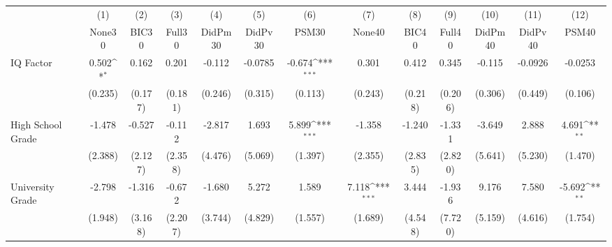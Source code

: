 {
\def\sym#1{\ifmmode^{#1}\else\(^{#1}\)\fi}
\begin{tabular}{l*{12}{c}}
\toprule
            &\multicolumn{1}{c}{(1)}&\multicolumn{1}{c}{(2)}&\multicolumn{1}{c}{(3)}&\multicolumn{1}{c}{(4)}&\multicolumn{1}{c}{(5)}&\multicolumn{1}{c}{(6)}&\multicolumn{1}{c}{(7)}&\multicolumn{1}{c}{(8)}&\multicolumn{1}{c}{(9)}&\multicolumn{1}{c}{(10)}&\multicolumn{1}{c}{(11)}&\multicolumn{1}{c}{(12)}\\
            &\multicolumn{1}{c}{None30}&\multicolumn{1}{c}{BIC30}&\multicolumn{1}{c}{Full30}&\multicolumn{1}{c}{DidPm30}&\multicolumn{1}{c}{DidPv30}&\multicolumn{1}{c}{PSM30}&\multicolumn{1}{c}{None40}&\multicolumn{1}{c}{BIC40}&\multicolumn{1}{c}{Full40}&\multicolumn{1}{c}{DidPm40}&\multicolumn{1}{c}{DidPv40}&\multicolumn{1}{c}{PSM40}\\
\midrule
IQ Factor   &       0.502\sym{*}  &       0.162         &       0.201         &      -0.112         &     -0.0785         &      -0.674\sym{***}&       0.301         &       0.412         &       0.345         &      -0.115         &     -0.0926         &     -0.0253         \\
            &     (0.235)         &     (0.177)         &     (0.181)         &     (0.246)         &     (0.315)         &     (0.113)         &     (0.243)         &     (0.218)         &     (0.206)         &     (0.306)         &     (0.449)         &     (0.106)         \\
\addlinespace
High School Grade&      -1.478         &      -0.527         &      -0.112         &      -2.817         &       1.693         &       5.899\sym{***}&      -1.358         &      -1.240         &      -1.331         &      -3.649         &       2.888         &       4.691\sym{**} \\
            &     (2.388)         &     (2.127)         &     (2.358)         &     (4.476)         &     (5.069)         &     (1.397)         &     (2.355)         &     (2.835)         &     (2.820)         &     (5.641)         &     (5.230)         &     (1.470)         \\
\addlinespace
University Grade&      -2.798         &      -1.316         &      -0.672         &      -1.680         &       5.272         &       1.589         &       7.118\sym{***}&       3.444         &      -1.936         &       9.176         &       7.580         &      -5.692\sym{**} \\
            &     (1.948)         &     (3.168)         &     (2.207)         &     (3.744)         &     (4.829)         &     (1.557)         &     (1.689)         &     (4.548)         &     (7.720)         &     (5.159)         &     (4.616)         &     (1.754)         \\

\end{tabular}}
